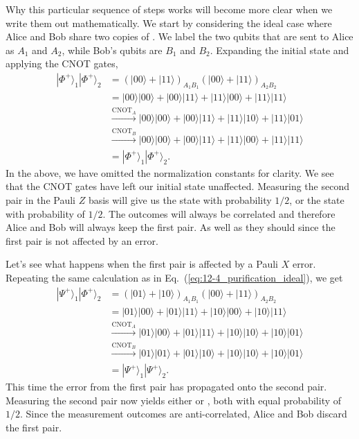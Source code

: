 Why this particular sequence of steps works will become more clear when we write them out mathematically.
We start by considering the ideal case where Alice and Bob share two copies of \ket{\Phi^+}.
We label the two qubits that are sent to Alice as $A_1$ and $A_2$, while Bob's qubits are $B_1$ and $B_2$.
Expanding the initial state and applying the CNOT gates,
\begin{align}
    |\Phi^{+}\rangle_{1} |\Phi^{+}\rangle_{2} & = (|00\rangle + |11\rangle)_{A_1B_1} (|00\rangle + |11\rangle)_{A_2B_2} \nonumber\\
    & = |00\rangle |00\rangle + |00\rangle |11\rangle + |11\rangle |00\rangle +|11\rangle |11\rangle \nonumber\\
    & \stackrel{\mathrm{CNOT}_{A}}{\longrightarrow} |00\rangle|00\rangle+|00\rangle|11\rangle+|11\rangle|10\rangle+|11\rangle|01\rangle \\
    & \stackrel{\mathrm{CNOT}_{B}}{\longrightarrow} |00\rangle|00\rangle+|00\rangle|11\rangle+|11\rangle|00\rangle+|11\rangle|11\rangle \nonumber \\
    & = |\Phi^{+}\rangle_{1} |\Phi^{+}\rangle_{2} \nonumber.
    \label{eq:12-4_purification_ideal}
\end{align}
In the above, we have omitted the normalization constants for clarity.
We see that the CNOT gates have left our initial state unaffected.
Measuring the second pair in the Pauli $Z$ basis will give us the state  with probability $1/2$, or the state  with probability of $1/2$.
The outcomes will always be correlated and therefore Alice and Bob will always keep the first pair.
As well as they should since the first pair is not affected by an error.

Let's see what happens when the first pair is affected by a Pauli $X$ error.
Repeating the same calculation as in Eq.~(\ref{eq:12-4_purification_ideal}), we get
\begin{align}
    |\Psi^{+}\rangle_{1} |\Phi^{+}\rangle_{2} & = (|01\rangle + |10\rangle)_{A_1B_1} (|00\rangle + |11\rangle)_{A_2B_2} \nonumber\\
    & = |01\rangle |00\rangle + |01\rangle |11\rangle + |10\rangle |00\rangle +|10\rangle |11\rangle \nonumber\\
    & \stackrel{\mathrm{CNOT}_{A}}{\longrightarrow} |01\rangle|00\rangle+|01\rangle|11\rangle + |10\rangle|10\rangle+|10\rangle|01\rangle \\
    & \stackrel{\mathrm{CNOT}_{B}}{\longrightarrow} |01\rangle|01\rangle+|01\rangle|10\rangle+|10\rangle|10\rangle+|10\rangle|01\rangle \nonumber \\
    & = |\Psi^{+}\rangle_{1} |\Psi^{+}\rangle_{2} \nonumber.
    \label{eq:12-4_purification_error}
\end{align}
This time the error from the first pair has propagated onto the second pair.
Measuring the second pair now yields either  or , both with equal probability of $1/2$.
Since the measurement outcomes are anti-correlated, Alice and Bob discard the first pair.

